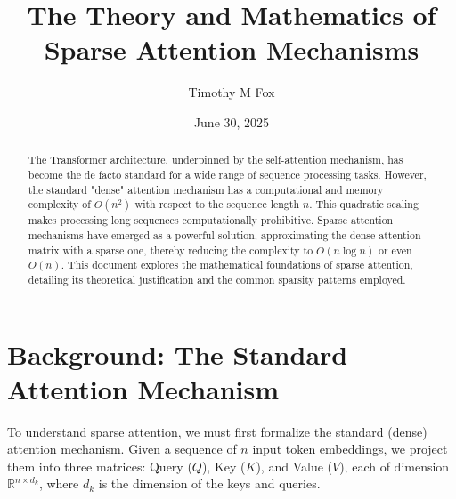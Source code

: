\documentclass{article}
\title{The Theory and Mathematics of Sparse Attention Mechanisms}
\author{Timothy M Fox}
\date{June 30, 2025}
\begin{document}
\maketitle

\begin{abstract}
The Transformer architecture, underpinned by the self-attention mechanism, has become the de facto standard for a wide range of sequence processing tasks. However, the standard "dense" attention mechanism has a computational and memory complexity of \(O(n^2)\) with respect to the sequence length \(n\). This quadratic scaling makes processing long sequences computationally prohibitive. Sparse attention mechanisms have emerged as a powerful solution, approximating the dense attention matrix with a sparse one, thereby reducing the complexity to \(O(n \log n)\) or even \(O(n)\). This document explores the mathematical foundations of sparse attention, detailing its theoretical justification and the common sparsity patterns employed.
\end{abstract}

\section{Background: The Standard Attention Mechanism}

To understand sparse attention, we must first formalize the standard (dense) attention mechanism. Given a sequence of \(n\) input token embeddings, we project them into three matrices: Query (\(Q\)), Key (\(K\)), and Value (\(V\)), each of dimension \(\mathbb{R}^{n \times d_k}\), where \(d_k\) is the dimension of the keys and queries.
\end{document}

